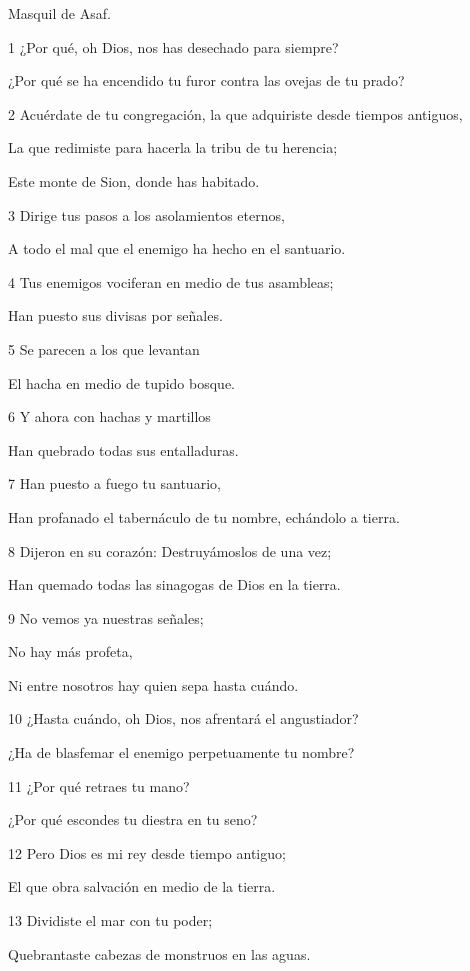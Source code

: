 \par Masquil de Asaf.

\par 1 ¿Por qué, oh Dios, nos has desechado para siempre?
\par ¿Por qué se ha encendido tu furor contra las ovejas de tu prado?
\par 2 Acuérdate de tu congregación, la que adquiriste desde tiempos antiguos,
\par La que redimiste para hacerla la tribu de tu herencia;
\par Este monte de Sion, donde has habitado.
\par 3 Dirige tus pasos a los asolamientos eternos,
\par A todo el mal que el enemigo ha hecho en el santuario.
\par 4 Tus enemigos vociferan en medio de tus asambleas;
\par Han puesto sus divisas por señales.
\par 5 Se parecen a los que levantan
\par El hacha en medio de tupido bosque.
\par 6 Y ahora con hachas y martillos
\par Han quebrado todas sus entalladuras.
\par 7 Han puesto a fuego tu santuario,
\par Han profanado el tabernáculo de tu nombre, echándolo a tierra.
\par 8 Dijeron en su corazón: Destruyámoslos de una vez;
\par Han quemado todas las sinagogas de Dios en la tierra.
\par 9 No vemos ya nuestras señales;
\par No hay más profeta,
\par Ni entre nosotros hay quien sepa hasta cuándo.
\par 10 ¿Hasta cuándo, oh Dios, nos afrentará el angustiador?
\par ¿Ha de blasfemar el enemigo perpetuamente tu nombre?
\par 11 ¿Por qué retraes tu mano?
\par ¿Por qué escondes tu diestra en tu seno?
\par 12 Pero Dios es mi rey desde tiempo antiguo;
\par El que obra salvación en medio de la tierra.
\par 13 Dividiste el mar con tu poder;
\par Quebrantaste cabezas de monstruos en las aguas.
